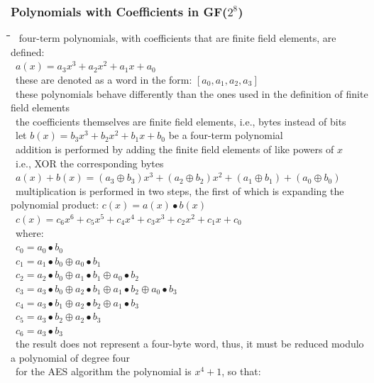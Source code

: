 \documentclass[10pt,letterpaper]{scrartcl}
\newcommand{\tbul}{\textbullet}
\newcommand{\tend}{\>\textendash}
\newcommand{\tabDef}{\hspace{2em}\=\hspace{2em}\=\hspace{2em}\=\hspace{2em}\=\kill}
\begin{document}
\subsubsection*{Polynomials with Coefficients in GF($2^8$)}\begin{tabbing}\tabDef 
\tbul\ four-term polynomials, with coefficients that are finite field elements, are defined: \\
\>\>\>\ $a(x)=a_3x^3+a_2x^2+a_1x+a_0$ \\
\tbul\ these are denoted as a word in the form: $[a_0, a_1, a_2, a_3]$ \\
\tbul\ these polynomials behave differently than the ones used in the definition of finite field elements\\
\tend\ the coefficients themselves are finite field elements, i.e., bytes instead of bits\\
\tbul\ let $b(x)=b_3x^3+b_2x^2+b_1x+b_0$ be a four-term polynomial \\
\tend\ addition is performed by adding the finite field elements of like powers of $x$\\
\tend\ i.e., XOR the corresponding bytes \\
\>\>\>\>\ $a(x)+b(x)=(a_3\oplus b_3)x^3+(a_2\oplus b_2)x^2+(a_1\oplus b_1)+(a_0\oplus b_0)$ \\
\tbul\ multiplication is performed in two steps, the first of which is expanding the polynomial product: $c(x)=a(x)\bullet b(x)$\\
\>\>\>\>\ $c(x)=c_6x^6+c_5x^5+c_4x^4+c_3x^3+c_2x^2+c_1x+c_0$ \\
\tend\ where: \\
\>\>\>\>\ $c_0 = a_0\bullet b_0$\\
\>\>\>\>\ $c_1=a_1\bullet b_0\oplus a_0\bullet b_1$\\
\>\>\>\>\ $c_2 = a_2\bullet b_0\oplus a_1\bullet b_1\oplus a_0\bullet b_2$\\
\>\>\>\>\ $c_3 = a_3\bullet b_0\oplus a_2\bullet b_1\oplus a_1\bullet b_2\oplus a_0\bullet b_3$\\
\>\>\>\>\ $c_4 = a_3\bullet b_1\oplus a_2\bullet b_2\oplus a_1\bullet b_3$ \\
\>\>\>\>\ $c_5 = a_3\bullet b_2\oplus a_2\bullet b_3$ \\
\>\>\>\>\ $c_6 = a_3\bullet b_3$ \\
\tend\ the result does not represent a four-byte word, thus, it must be reduced modulo a polynomial of degree four \\
\tend\ for the AES algorithm the polynomial is $x^4+1$, so that: \\

\end{tabbing}
\end{document}
